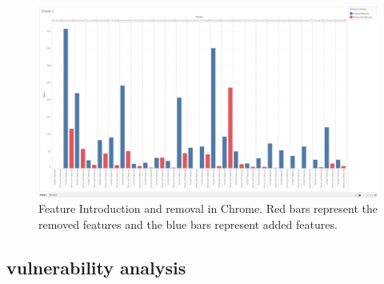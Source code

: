 \begin{figure}[ht]
    \centering
    \includegraphics[width=\columnwidth]{figures/addremove-feature-trend-chrome}
    \caption{Feature Introduction and removal in Chrome. Red bars represent the removed features and the blue bars represent added features.}
    \label{fig:times_bar}
\end{figure}


\subsection{vulnerability analysis}

